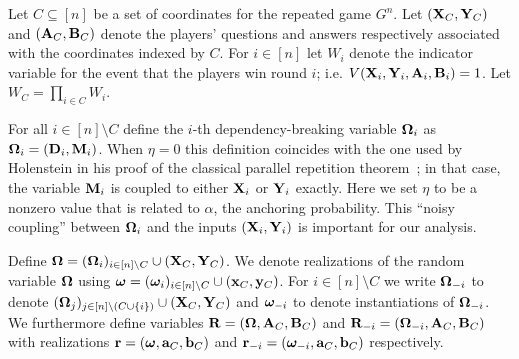 Let $C \subseteq [n]$ be a set of coordinates for the repeated game $G^n$. 
Let $(\mathbf{X}_C,\mathbf{Y}_C)$ and $(\mathbf{A}_C,\mathbf{B}_C)$ denote the players' questions and answers respectively associated with the coordinates indexed by $C$. For $i \in [n]$ let $W_i$ denote the indicator variable for the event that the players win round $i$; i.e. $V(\mathbf{X}_i,\mathbf{Y}_i,\mathbf{A}_i,\mathbf{B}_i) = 1$. Let $W_C = \prod_{i \in C} W_i$. 

For all $i \in [n] \setminus C$ define the $i$-th dependency-breaking variable ${\boldsymbol{\Omega}}_i$ as ${\boldsymbol{\Omega}}_i = (\mathbf{D}_i,\mathbf{M}_i)$. When $\eta = 0$ this definition coincides with the one used by Holenstein in his proof of the classical parallel repetition theorem~\cite{Hol09}; in that case, the variable $\mathbf{M}_i$ is coupled to either $\mathbf{X}_i$ or $\mathbf{Y}_i$ exactly. Here we set $\eta$ to be a nonzero value that is related to $\alpha$, the anchoring probability. This ``noisy coupling'' between ${\boldsymbol{\Omega}}_i$ and the inputs $(\mathbf{X}_i,\mathbf{Y}_i)$ is important for our analysis. 




Define ${\boldsymbol{\Omega}} = ({\boldsymbol{\Omega}}_i)_{i \in [n] \setminus C} \cup (\mathbf{X}_C,\mathbf{Y}_C)$. We denote realizations of the random variable ${\boldsymbol{\Omega}}$ using ${\boldsymbol{\omega}} = ({\boldsymbol{\omega}}_i)_{i \in [n] \setminus C} \cup (\mathbf{x}_C,\mathbf{y}_C)$. For $i \in [n] \setminus C$ we write ${\boldsymbol{\Omega}}_{-i}$ to denote $({\boldsymbol{\Omega}}_j)_{j \in [n] \setminus (C \cup \{i\})} \cup (\mathbf{X}_C,\mathbf{Y}_C)$ and ${\boldsymbol{\omega}}_{-i}$ to denote instantiations of ${\boldsymbol{\Omega}}_{-i}$. We furthermore define variables $\mathbf{R} = ({\boldsymbol{\Omega}},\mathbf{A}_C,\mathbf{B}_C)$ and $\mathbf{R}_{-i} = ({\boldsymbol{\Omega}}_{-i},\mathbf{A}_C,\mathbf{B}_C)$ with realizations $\mathbf{r} = ({\boldsymbol{\omega}},\mathbf{a}_C,\mathbf{b}_C)$ and $\mathbf{r}_{-i} = ({\boldsymbol{\omega}}_{-i},\mathbf{a}_C,\mathbf{b}_C)$ respectively.




%
%
% 
